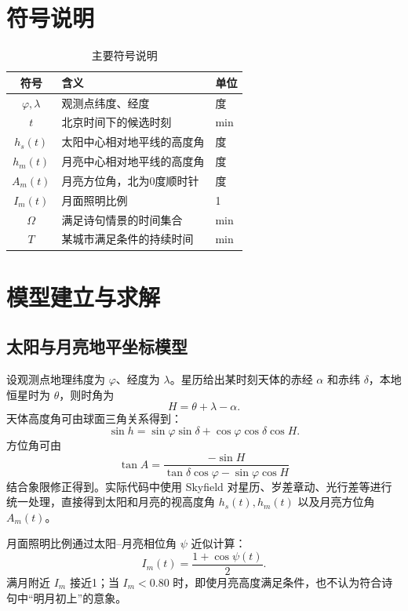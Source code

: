 \documentclass[UTF8,a4paper,12pt]{ctexart}
\begin{document}
\section{符号说明}
\begin{table}[H]\centering\caption{主要符号说明}
\begin{tabular}{cll}
\toprule
符号 & 含义 & 单位 \\
\midrule
$\varphi,\lambda$ & 观测点纬度、经度 & 度 \\
$t$ & 北京时间下的候选时刻 & min \\
$h_s(t)$ & 太阳中心相对地平线的高度角 & 度 \\
$h_m(t)$ & 月亮中心相对地平线的高度角 & 度 \\
$A_m(t)$ & 月亮方位角，北为0度顺时针 & 度 \\
$I_m(t)$ & 月面照明比例 & 1 \\
$\Omega$ & 满足诗句情景的时间集合 & min \\
$T$ & 某城市满足条件的持续时间 & min \\
\bottomrule
\end{tabular}
\end{table}

\section{模型建立与求解}
\subsection{太阳与月亮地平坐标模型}
设观测点地理纬度为 $\varphi$、经度为 $\lambda$。星历给出某时刻天体的赤经 $\alpha$ 和赤纬 $\delta$，本地恒星时为 $\theta$，则时角为
\begin{equation}
H=\theta+\lambda-\alpha .
\end{equation}
天体高度角可由球面三角关系得到：
\begin{equation}
\sin h=\sin\varphi\sin\delta+\cos\varphi\cos\delta\cos H .
\end{equation}
方位角可由
\begin{equation}
\tan A=\frac{-\sin H}{\tan\delta\cos\varphi-\sin\varphi\cos H}
\end{equation}
结合象限修正得到。实际代码中使用 Skyfield 对星历、岁差章动、光行差等进行统一处理，直接得到太阳和月亮的视高度角 $h_s(t),h_m(t)$ 以及月亮方位角 $A_m(t)$。

月面照明比例通过太阳--月亮相位角 $\psi$ 近似计算：
\begin{equation}
I_m(t)=\frac{1+\cos\psi(t)}{2} .
\end{equation}
满月附近 $I_m$ 接近1；当 $I_m<0.80$ 时，即使月亮高度满足条件，也不认为符合诗句中“明月初上”的意象。
\end{document}
